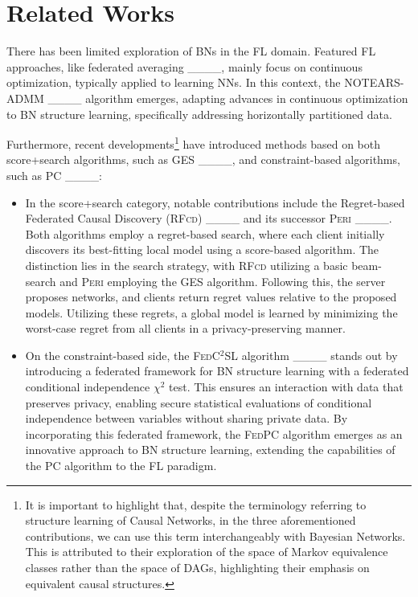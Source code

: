 \section{Related Works}
\label{subsec:relatedWorks}

There has been limited exploration of BNs in the FL domain. Featured FL approaches, like federated averaging ____, mainly focus on continuous optimization, typically applied to learning NNs. In this context, the NOTEARS-ADMM ____ algorithm emerges, adapting advances in continuous optimization to BN structure learning, specifically addressing horizontally partitioned data.

Furthermore, recent developments\footnote{It is important to highlight that, despite the terminology referring to structure learning of Causal Networks, in the three aforementioned contributions, we can use this term interchangeably with Bayesian Networks. This is attributed to their exploration of the space of Markov equivalence classes rather than the space of DAGs, highlighting their emphasis on equivalent causal structures.} have introduced methods based on both score+search algorithms, such as GES ____, and constraint-based algorithms, such as PC ____:
\begin{itemize}
    \item In the score+search category, notable contributions include the Regret-based Federated Causal Discovery (\textsc{RFcd}) ____ and its successor \textsc{Peri} ____. Both algorithms employ a regret-based search, where each client initially discovers its best-fitting local model using a score-based algorithm. The distinction lies in the search strategy, with \textsc{RFcd} utilizing a basic beam-search and \textsc{Peri} employing the GES algorithm. Following this, the server proposes networks, and clients return regret values relative to the proposed models. Utilizing these regrets, a global model is learned by minimizing the worst-case regret from all clients in a privacy-preserving manner.

    \item On the constraint-based side, the \textsc{FedC$^2$SL} algorithm ____ stands out by introducing a federated framework for BN structure learning with a federated conditional independence $\chi^2$ test. This ensures an interaction with data that preserves privacy, enabling secure statistical evaluations of conditional independence between variables without sharing private data. By incorporating this federated framework, the \textsc{FedPC} algorithm emerges as an innovative approach to BN structure learning, extending the capabilities of the PC algorithm to the FL paradigm.
\end{itemize}

%
%
